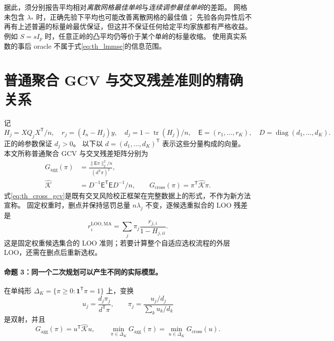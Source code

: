 \documentclass[UTF8,fontset=fandol,11pt,a4paper]{ctexart}
\begin{document}
据此，须分别报告平均相对\emph{离散网格最佳单岭}与\emph{连续调参最佳单岭}的差距。
网格未包含 $\lambda_*$ 时，正确先验下平均也可能改善离散网格的最佳值；
先验各向异性后不再有上述普遍的标量岭最优保证，但这并不保证任何给定平均家族都有严格收益。
例如 $S=sI_p$ 时，任意正岭的凸平均仍等价于某个单岭的标量收缩。
使用真实系数的事后 oracle 不属于式\eqref{eq:th_lmmse}的信息范围。

\section{普通聚合 GCV 与交叉残差准则的精确关系}\label{sec:theory_gcv}
记
\begin{equation}\label{eq:th_gcv_notation}
 H_j=XQ_jX^{\mathsf T}/n,\quad r_j=(I_n-H_j)y,\quad
 d_j=1-\operatorname{tr}(H_j)/n,\quad
 \mathsf E=(r_1,\ldots,r_K),\quad D=\operatorname{diag}(d_1,\ldots,d_K).
\end{equation}
正的岭参数保证 $d_j>0$。
以下以 $d=(d_1,\ldots,d_K)^{\mathsf T}$ 表示这些分量构成的向量。
本文所称普通聚合 GCV 与交叉残差矩阵分别为
\begin{align}
 G_{\mathrm{agg}}(\pi)
 &=\frac{\lVert\mathsf E\pi\rVert_2^2/n}{(d^{\mathsf T}\pi)^2},\label{eq:th_agg_gcv}\\
 \widehat{\mathcal K}
 &=D^{-1}\mathsf E^{\mathsf T}\mathsf E D^{-1}/n,\qquad
 G_{\mathrm{cross}}(\pi)=\pi^{\mathsf T}\widehat{\mathcal K}\pi.
 \label{eq:th_cross_gcv}
\end{align}
式\eqref{eq:th_cross_gcv}是既有交叉风险校正框架在完整数据上的形式\cite{bellec}，不作为新方法宣称。
固定权重时，删点并保持惩罚总量 $n\lambda_j$ 不变，逐候选重拟合的 LOO 残差是
\begin{equation}\label{eq:th_loo}
 r_i^{\mathrm{LOO,MA}}=\sum_j\pi_j\frac{r_{j,i}}{1-H_{j,ii}}.
\end{equation}
这是固定权重候选集合的 LOO 准则；若要计算整个自适应选权流程的外层 LOO，还需在删点后重新选权。

\paragraph{命题 3：同一个二次规划可以产生不同的实际模型。}
在单纯形 $\Delta_K=\{\pi\ge0:\boldsymbol1^{\mathsf T}\pi=1\}$ 上，变换
\begin{equation}\label{eq:th_gcv_map}
 u_j=\frac{d_j\pi_j}{d^{\mathsf T}\pi},\qquad
 \pi_j=\frac{u_j/d_j}{\sum_k u_k/d_k}
\end{equation}
是双射，并且
\begin{equation}\label{eq:th_gcv_equiv}
 G_{\mathrm{agg}}(\pi)=u^{\mathsf T}\widehat{\mathcal K}u,\qquad
 \min_{\pi\in\Delta_K}G_{\mathrm{agg}}(\pi)
 =\min_{u\in\Delta_K}G_{\mathrm{cross}}(u).
\end{equation}
\end{document}
